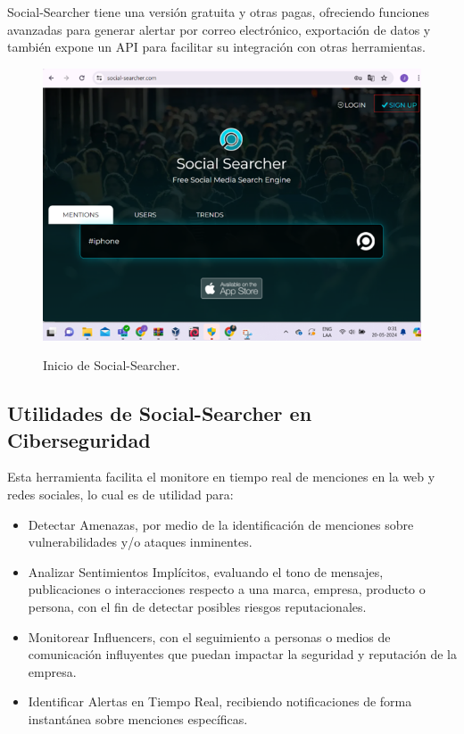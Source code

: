 \documentclass[stu, 11pt, letterpaper, donotrepeattitle, floatsintext, natbib]{apa7}
\begin{document}
Social-Searcher tiene una versión gratuita y otras pagas, ofreciendo funciones avanzadas para generar alertar por correo electrónico, exportación de datos y también expone un API para facilitar su integración con otras herramientas.

\begin{figure}[H]
\centering
\caption{Inicio de Social-Searcher.}
\includegraphics[width=0.75\linewidth]{osi4.png} %
\label{fig:OverallEffect}
\end{figure}

\subsection{Utilidades de Social-Searcher en Ciberseguridad}

Esta herramienta facilita el monitore en tiempo real de menciones en la web y redes sociales, lo cual es de utilidad para:

\begin{itemize}
\item Detectar Amenazas, por medio de la identificación de menciones sobre vulnerabilidades y/o ataques inminentes.
\item Analizar Sentimientos Implícitos, evaluando el tono de mensajes, publicaciones o interacciones respecto a una marca, empresa, producto o persona, con el fin de detectar posibles riesgos reputacionales.
\item Monitorear Influencers, con el seguimiento a personas o medios de comunicación influyentes que puedan impactar la seguridad y reputación de la empresa.
\item Identificar Alertas en Tiempo Real, recibiendo notificaciones de forma instantánea sobre menciones específicas.
\end{itemize}
\end{document}
